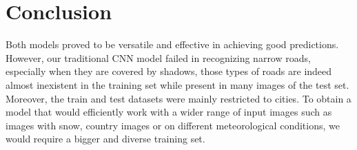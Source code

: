 \documentclass[10pt,conference,compsocconf]{IEEEtran}
\begin{document}
\section{Conclusion}
\label{sec:conclusion}
Both models proved to be versatile and effective in achieving good predictions. However, our traditional CNN model failed in recognizing narrow roads, especially when they are covered by shadows, those types of roads are indeed almost inexistent in the training set while present in many images of the test set. Moreover, the train and test datasets were mainly restricted to cities. To obtain a model that would efficiently work with a wider range of input images such as images with snow, country images or on different meteorological conditions, we would require a bigger and diverse training set.



\end{document}
